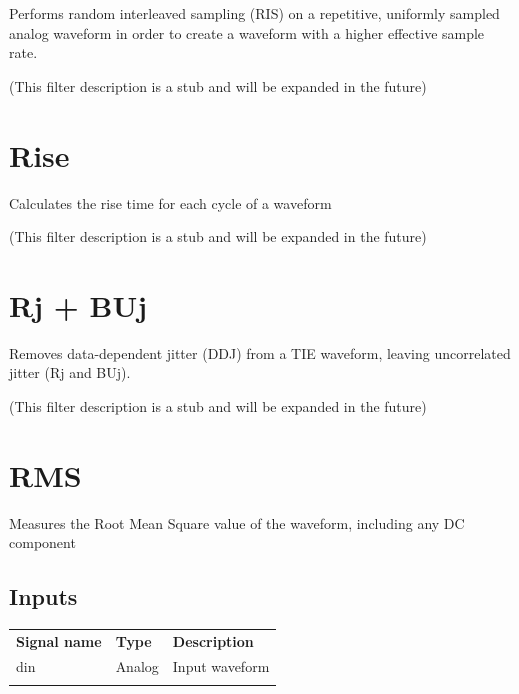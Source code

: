 Performs random interleaved sampling (RIS) on a repetitive, uniformly sampled analog waveform in order to create a
waveform with a higher effective sample rate.

(This filter description is a stub and will be expanded in the future)

\pagebreak
\section{Rise}

Calculates the rise time for each cycle of a waveform

(This filter description is a stub and will be expanded in the future)

\pagebreak
\section{Rj + BUj}

Removes data-dependent jitter (DDJ) from a TIE waveform, leaving uncorrelated jitter (Rj and BUj).

(This filter description is a stub and will be expanded in the future)

\pagebreak
\section{RMS}
\label{filter:rms}

Measures the Root Mean Square value of the waveform, including any DC component


\subsection{Inputs}

\begin{tabularx}{16cm}{llX}
\thickhline
\textbf{Signal name} & \textbf{Type} & \textbf{Description} \\
\thickhline
din & Analog & Input waveform \\
\thickhline
\end{tabularx}

